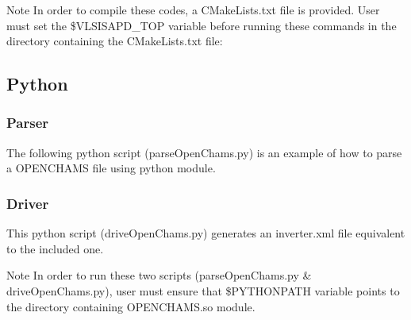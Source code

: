 \begin{DoxyNote}{Note}
In order to compile these codes, a C\+Make\+Lists.\+txt file is provided. User must set the \$\+V\+L\+S\+I\+S\+A\+P\+D\+\_\+\+T\+OP variable before running these commands in the directory containing the C\+Make\+Lists.\+txt file\+: 
\begin{DoxyCode}
\end{DoxyCode}

\end{DoxyNote}
\hypertarget{openchams_openChamsPython}{}\subsection{Python}\label{openchams_openChamsPython}
\hypertarget{openchams_openChamsParsePython}{}\subsubsection{Parser}\label{openchams_openChamsParsePython}
The following python script ({\ttfamily parse\+Open\+Chams.\+py}) is an example of how to parse a O\+P\+E\+N\+C\+H\+A\+MS file using python module. 
\begin{DoxyCodeInclude}
\end{DoxyCodeInclude}
\hypertarget{openchams_openChamsDrivePython}{}\subsubsection{Driver}\label{openchams_openChamsDrivePython}
This python script ({\ttfamily drive\+Open\+Chams.\+py}) generates an inverter.\+xml file equivalent to the included one. 
\begin{DoxyCodeInclude}
\end{DoxyCodeInclude}


\begin{DoxyNote}{Note}
In order to run these two scripts ({\ttfamily parse\+Open\+Chams.\+py} \& drive\+Open\+Chams.\+py), user must ensure that \$\+P\+Y\+T\+H\+O\+N\+P\+A\+TH variable points to the directory containing O\+P\+E\+N\+C\+H\+A\+M\+S.\+so module. 
\end{DoxyNote}
